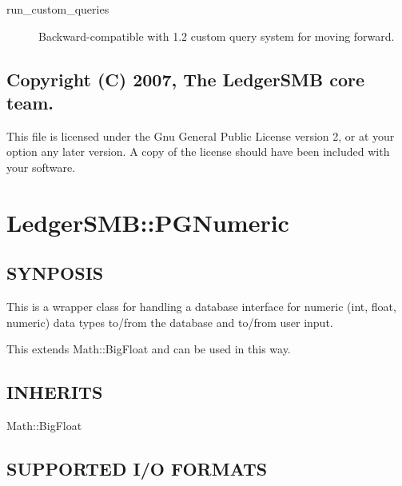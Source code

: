 \begin{description}
\begin{description}
\begin{description}
\begin{description}
\begin{description}
\begin{description}
\begin{description}
\begin{description}
\begin{description}
\begin{description}
\begin{description}
\item[{run\_custom\_queries}] \mbox{}

Backward-compatible with 1.2 custom query system for moving forward.

\end{description}
\subsection*{Copyright (C) 2007, The LedgerSMB core team.\label{LedgerSMB::DBObject_Moose_Copyright_C_2007_The_LedgerSMB_core_team_}}


This file is licensed under the Gnu General Public License version 2, or at your
option any later version.  A copy of the license should have been included with
your software.

\section{LedgerSMB::PGNumeric\label{LedgerSMB::PGNumeric}}




\subsection*{SYNPOSIS\label{LedgerSMB::PGNumeric_SYNPOSIS}}


This is a wrapper class for handling a database interface for numeric (int, 
float, numeric) data types to/from the database and to/from user input.



This extends Math::BigFloat and can be used in this way.

\subsection*{INHERITS\label{LedgerSMB::PGNumeric_INHERITS}}
\begin{description}

\item[{Math::BigFloat}] \mbox{}\end{description}
\subsection*{SUPPORTED I/O FORMATS\label{LedgerSMB::PGNumeric_SUPPORTED_I_O_FORMATS}}
\begin{enumerate}


\end{enumerate}
\end{description}
\end{description}
\end{description}
\end{description}
\end{description}
\end{description}
\end{description}
\end{description}
\end{description}
\end{description}
